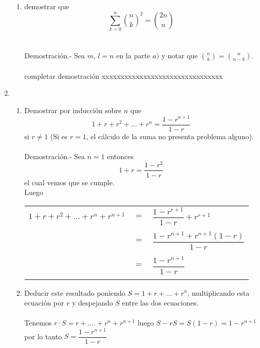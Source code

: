 \begin{enumerate}
\begin{enumerate}[\bfseries (a)]
\item demostrar que $$\displaystyle\sum_{k=0}^{n} {n \choose k}^2 = {2n \choose n}$$\\\\
Demostración.- \; Sea $m$, $l=n$ en la parte $a)$ y notar que ${n \choose k} = {n \choose n-k}.$ \\\\ {\color{green}completar demostración xxxxxxxxxxxxxxxxxxxxxxxxxxxxxxxx}
\end{enumerate}

\item 
\begin{enumerate}[\bfseries (a)]
\item Demostrar por inducción sobre $n$ que $$1 + r +r^2 + ... + r^n = \dfrac{1 - r^{n+1}}{1-r}$$ si $r\neq 1$ (Si es $r=1$, el cálculo de la suma no presenta problema alguno).\\\\
Demostración.- \; Sea $n=1$ entonces $$1+r = \dfrac{1- r^2}{1-r}$$ el cual vemos que se cumple.\\
Luego
\begin{center}
\begin{tabular}{r c l}
$1+r+r^2 + ... + r^n + r^{n+1}$&$=$&$\dfrac{1- r^{r+1}}{1-r} + r^{r+1}$\\\\
&$=$&$\dfrac{1 - r^{n+1} + r^{n+1} (1-r)}{1-r}$\\\\
&$=$&$\dfrac{1 - r^{n+1}}{1-r}$\\\\
\end{tabular}
\end{center} 

\item Deducir este resultado poniendo $S=1+r+...+r^n$, multiplicando esta ecuación por $r$ y despejando $S$ entre las dos ecuaciones.\\\\
Tenemos $r\cdot S = r + .... + r^n + r^{n+1}$ luego $S - rS = S(1-r) = 1-r^{n+1}$ por lo tanto $S = \dfrac{1-r^{n+1}}{1-r}$\\\\
\end{enumerate}


\end{enumerate}
